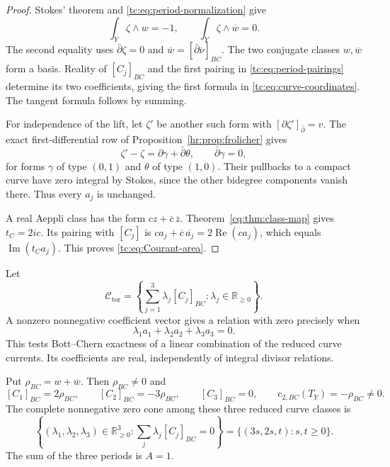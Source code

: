 \begin{proof}
Stokes' theorem and \eqref{tc:eq:period-normalization} give
\begin{equation}\label{tc:eq:period-pairings}
       \int_Y\zeta\wedge w=-1,
       \qquad \int_Y\zeta\wedge\overline w=0.
\end{equation}
The second equality uses $\bar\partial\zeta=0$ and
$\overline w=[\bar\partial\overline\nu]_{BC}$.
The two conjugate classes $w,\overline w$ form a basis.
Reality of $[C_j]_{BC}$ and the first pairing in
\eqref{tc:eq:period-pairings} determine its two coefficients,
giving the first formula in \eqref{tc:eq:curve-coordinates}.
The tangent formula follows by summing.

For independence of the lift, let $\zeta'$ be another such form
with $[\partial\zeta']_{\bar\partial}=v$.
The exact first-differential row of
Proposition~\ref{hr:prop:frolicher} gives
\[
         \zeta'-\zeta=\partial\gamma+\bar\partial\theta,
         \qquad \bar\partial\gamma=0,
\]
for forms $\gamma$ of type $(0,1)$ and $\theta$ of type $(1,0)$.
Their pullbacks to a compact curve have zero integral by Stokes,
since the other bidegree components vanish there.
Thus every $a_j$ is unchanged.

A real Aeppli class has the form $cz+\overline c\,\overline z$.
Theorem~\ref{cq:thm:class-map} gives $t_C=2ic$.
Its pairing with $[C_j]$ is
$ca_j+\overline c\,\overline{a_j}=2\operatorname{Re}(ca_j)$,
which equals $\operatorname{Im}(t_Ca_j)$.
This proves \eqref{tc:eq:Courant-area}.
\end{proof}

Let
\begin{equation}\label{tc:eq:curve-cone}
 \mathcal C_{\mathrm{tor}}
    =\left\{\sum_{j=1}^3\lambda_j[C_j]_{BC}:
                                  \lambda_j\in\mathbb R_{\ge0}\right\}.
\end{equation}
A nonzero nonnegative coefficient vector gives a relation with
zero precisely when
\begin{equation}\label{tc:eq:cone-zero}
              \lambda_1a_1+\lambda_2a_2+\lambda_3a_3=0.
\end{equation}
This tests Bott--Chern exactness of a linear combination of the
reduced curve currents. Its coefficients are real, independently
of integral divisor relations.

\begin{theorem}\label{tc:thm:evaluated-curves}
Put $\rho_{BC}=w+\overline w$. Then $\rho_{BC}\ne0$ and
\begin{equation}\label{tc:eq:evaluated-curves}
 [C_1]_{BC}=2\rho_{BC},\qquad
 [C_2]_{BC}=-3\rho_{BC},\qquad [C_3]_{BC}=0,
 \qquad c_{2,BC}(T_Y)=-\rho_{BC}\ne0.
\end{equation}
The complete nonnegative zero cone among these three reduced
curve classes is
\begin{equation}\label{tc:eq:exact-positive-cone}
 \left\{(\lambda_1,\lambda_2,\lambda_3)\in\mathbb R_{\ge0}^3:
                       \sum_j\lambda_j[C_j]_{BC}=0\right\}
       =\{(3s,2s,t):s,t\ge0\}.
\end{equation}
The sum of the three periods is $A=1$.
\end{theorem}

